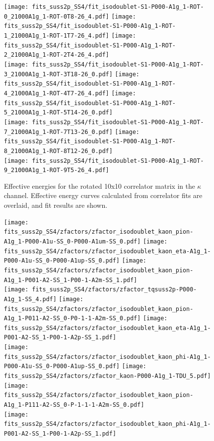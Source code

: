 \begin{figure}
  \texttt{[image: fits\_suss2p\_SS4/fit\_isodoublet-S1-P000-A1g\_1-ROT-0\_21000A1g\_1-ROT-0T8-26\_4.pdf]}
  \texttt{[image: fits\_suss2p\_SS4/fit\_isodoublet-S1-P000-A1g\_1-ROT-1\_21000A1g\_1-ROT-1T7-26\_4.pdf]}
  \texttt{[image: fits\_suss2p\_SS4/fit\_isodoublet-S1-P000-A1g\_1-ROT-2\_21000A1g\_1-ROT-2T4-26\_4.pdf]}\\
  \texttt{[image: fits\_suss2p\_SS4/fit\_isodoublet-S1-P000-A1g\_1-ROT-3\_21000A1g\_1-ROT-3T18-26\_0.pdf]}
  \texttt{[image: fits\_suss2p\_SS4/fit\_isodoublet-S1-P000-A1g\_1-ROT-4\_21000A1g\_1-ROT-4T7-26\_4.pdf]}
  \texttt{[image: fits\_suss2p\_SS4/fit\_isodoublet-S1-P000-A1g\_1-ROT-5\_21000A1g\_1-ROT-5T14-26\_0.pdf]}\\
  \texttt{[image: fits\_suss2p\_SS4/fit\_isodoublet-S1-P000-A1g\_1-ROT-7\_21000A1g\_1-ROT-7T13-26\_0.pdf]}
  \texttt{[image: fits\_suss2p\_SS4/fit\_isodoublet-S1-P000-A1g\_1-ROT-8\_21000A1g\_1-ROT-8T12-26\_0.pdf]}\\
  \texttt{[image: fits\_suss2p\_SS4/fit\_isodoublet-S1-P000-A1g\_1-ROT-9\_21000A1g\_1-ROT-9T5-26\_4.pdf]}
  \caption{Effective energies for the rotated 10x10 correlator matrix in the $\kappa$ channel. Effective energy curves calculated from correlator fits are overlaid, and fit results are shown.}\label{fig:kappa_tq_grid}
\end{figure}

\begin{figure}
  \texttt{[image: fits\_suss2p\_SS4/zfactors/zfactor\_isodoublet\_kaon\_pion-A1g\_1-P000-A1u-SS\_0-P000-A1um-SS\_0.pdf]}
  \texttt{[image: fits\_suss2p\_SS4/zfactors/zfactor\_isodoublet\_kaon\_eta-A1g\_1-P000-A1u-SS\_0-P000-A1up-SS\_0.pdf]}
  \texttt{[image: fits\_suss2p\_SS4/zfactors/zfactor\_isodoublet\_kaon\_pion-A1g\_1-P001-A2-SS\_1-P00-1-A2m-SS\_1.pdf]}\\
  \texttt{[image: fits\_suss2p\_SS4/zfactors/zfactor\_tqsuss2p-P000-A1g\_1-SS\_4.pdf]}
  \texttt{[image: fits\_suss2p\_SS4/zfactors/zfactor\_isodoublet\_kaon\_pion-A1g\_1-P011-A2-SS\_0-P0-1-1-A2m-SS\_0.pdf]}
  \texttt{[image: fits\_suss2p\_SS4/zfactors/zfactor\_isodoublet\_kaon\_eta-A1g\_1-P001-A2-SS\_1-P00-1-A2p-SS\_1.pdf]}\\
  \texttt{[image: fits\_suss2p\_SS4/zfactors/zfactor\_isodoublet\_kaon\_phi-A1g\_1-P000-A1u-SS\_0-P000-A1up-SS\_0.pdf]}
  \texttt{[image: fits\_suss2p\_SS4/zfactors/zfactor\_kaon-P000-A1g\_1-TDU\_5.pdf]}
  \texttt{[image: fits\_suss2p\_SS4/zfactors/zfactor\_isodoublet\_kaon\_pion-A1g\_1-P111-A2-SS\_0-P-1-1-1-A2m-SS\_0.pdf]}\\
  \texttt{[image: fits\_suss2p\_SS4/zfactors/zfactor\_isodoublet\_kaon\_phi-A1g\_1-P001-A2-SS\_1-P00-1-A2p-SS\_1.pdf]}
\end{figure}
